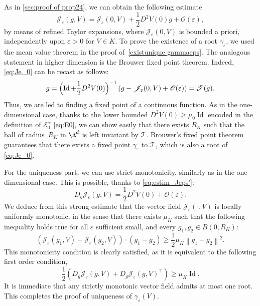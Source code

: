 \documentclass[JEP,XML,SOM,Unicode]{cedram}
\let\mathcal\mathscr
\newcommand{\cO}{\mathcal{O}}
\newcommand{\cT}{\mathcal{T}}
\theoremstyle{plain}
\theoremstyle{definition}
\newcommand{\Je}{\mathcal{J}_\eps}
\let\eps\varepsilon
\newcommand{\norm}[1]{\left\lVert#1\right\rVert}
\newcommand{\Eaz}{\mathcal{E}^\alpha_0}
\DeclareMathOperator{\Id}{Id}
\begin{document}
As in \cref{sec:proof of prop24}, we can obtain the following estimate
\begin{equation}\label{eq:prep brouwer}
\Je(g,V) = \Je(0,V) + \frac12 D^2 V(0) g + \cO(\eps),
\end{equation}
by means of refined Taylor expansions, where $\Je(0,V)$ is bounded a priori, independently upon $\eps>0$ for $V\in K$. To prove the existence of a root $\gamma_\eps$, we used the mean value theorem in the proof of~\cref{existunique gammaeps}. The analogous statement in higher dimension is the Brouwer fixed point theorem. Indeed, \eqref{eq:Je_0} can be recast as follows:
\begin{align*}
g = \Bigl (\Id + \dfrac{1}{2} D^2 V(0) \Bigr)^{-1}\left (g - \Je(0,V) + \cO(\eps)\right) = \cT(g).
\end{align*}
Thus, we are led to finding a fixed point of a continuous function. As in the one-dimensional case, thanks to the lower bounded $D^2V(0) \geq \mu_0 \Id$ encoded in the definition of $\Eaz$ \eqref{eq:E0}, we can show easily that there exists $R_K$ such that the ball of radius~$R_K$ in $\R^d$ is left invariant by $\cT$.
Brouwer's fixed point theorem guarantees that there exists a fixed point $\gamma_\eps$ to $\cT$, which is also a root of \eqref{eq:Je_0}.

For the uniqueness part, we can use strict monotonicity, similarly as in the one dimensional case. This is possible, thanks to \eqref{eq:estim_Jeps'}:
\begin{equation}\label{eq:pJe_approx}
D_g \Je(g,V) =\frac12 D^2 V(0) + \cO(\eps).
\end{equation}
We deduce from this strong estimate that the vector field $\Je(\cdot,V)$ is locally uniformly monotonic, in the sense that there exists $\mu_K$ such that the following inequality holds true for all $\eps$ sufficient small, and every $g_1,g_2\in B(0,R_K)$:
\begin{equation}\label{eq:cond posvectorfield}
\left(\Je(g_1,V)-\Je(g_2,V)\right) \cdot(g_1-g_2)\geq \frac12 \mu_K \norm{g_1-g_2}^2.
\end{equation}
This monotonicity condition is clearly satisfied, as it is equivalent to the following first order condition,
\begin{equation}\label{eq:jacob pos}
\dfrac{1}{2} \left(D_g \Je(g,V) + D_g \Je(g,V)^\top \right) \geq \mu_K \Id.
\end{equation}
It is immediate that any strictly monotonic vector field admits at most one root. This completes the proof of uniqueness of $\gamma_\eps(V)$.




\end{document}
